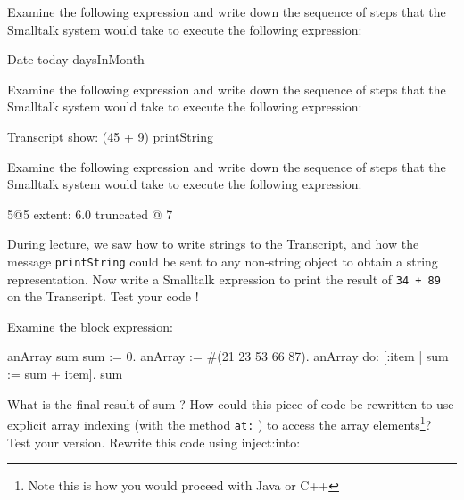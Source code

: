 \exercise Examine the following expression and write down the sequence of steps that the Smalltalk system would take to execute the following expression:
\begin{code}
Date today daysInMonth
\end{code}
\exercise Examine the following expression and write down the
sequence of steps that the Smalltalk system would take to execute
the following expression:
\begin{code}
Transcript show: (45 + 9) printString
\end{code}
\exercise Examine the following expression and write down the
sequence of steps that the Smalltalk system would take to execute
the following expression:
\begin{code}
5@5 extent: 6.0 truncated @ 7
\end{code}
\exercise During lecture, we saw how to write strings to the
Transcript, and how the message \texttt{printString} could be sent
to any non-string object to obtain a string representation. Now
write a Smalltalk expression to print the result of \texttt{34 +
89} on the Transcript. Test your code !

\newpage
\exercise Examine the block expression:

\begin{code}
\ttt{|} anArray sum \ttt{|}
sum := 0.
anArray := #(21 23 53 66 87).
anArray do: [:item | sum := sum + item].
sum
\end{code}

What is the final result of sum ? How could this piece of code be
rewritten to use explicit array indexing (with the method
\texttt{at:} ) to access the array elements\footnote{Note this is
how you would proceed with Java or C++}? Test your version.
Rewrite this code using inject:into:


\ifx\wholebook\relax\else\fi
